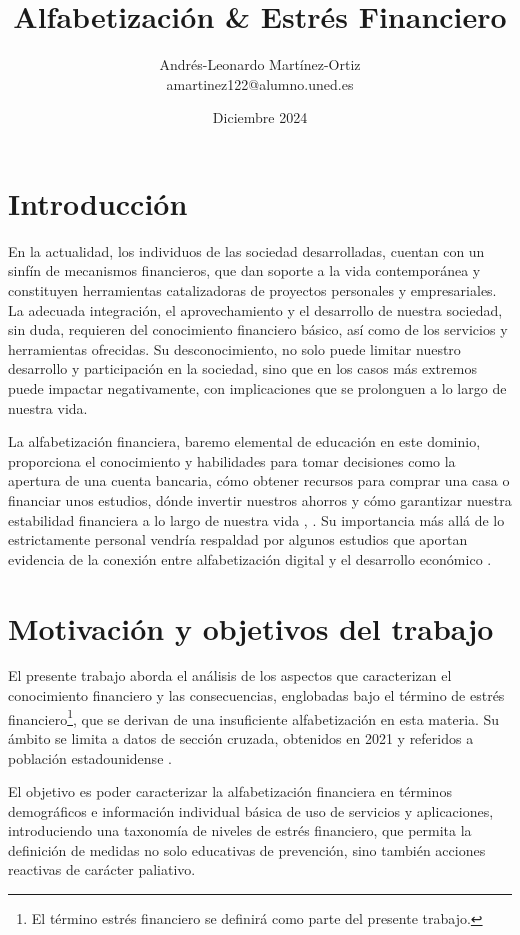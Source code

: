 \documentclass[a4paper, 11pt, bibliography=numbered, es]{article}
\title{Alfabetización \& Estrés Financiero}
\author{Andrés-Leonardo Martínez-Ortiz \\ amartinez122@alumno.uned.es}
\date{Diciembre 2024}
\begin{document}
\maketitle
\section{Introducción}
En la actualidad, los individuos de las sociedad desarrolladas, cuentan con 
un sinfín de mecanismos financieros, que dan soporte a la vida contemporánea
y constituyen herramientas catalizadoras de proyectos personales y empresariales. La adecuada integración, el aprovechamiento y el desarrollo de
nuestra sociedad, sin duda, requieren del conocimiento financiero básico, así como
de los servicios y herramientas ofrecidas. Su desconocimiento, no solo puede limitar
nuestro desarrollo y participación en la sociedad, sino que en los casos más extremos
puede impactar negativamente, con implicaciones que se prolonguen a lo largo de nuestra
vida. 

La alfabetización financiera, baremo elemental de educación en este dominio, 
proporciona el conocimiento y habilidades para tomar decisiones como la 
apertura de una cuenta bancaria, cómo obtener recursos para comprar una
casa o financiar unos estudios, dónde invertir nuestros ahorros y cómo 
garantizar nuestra estabilidad financiera a lo largo de nuestra vida
\cite{EU01}, \cite{OCDE01}. Su importancia más allá de lo estrictamente personal vendría respaldad por algunos estudios que aportan evidencia de
la conexión entre alfabetización digital y el desarrollo económico \cite{Lusardi14}. 

\section{Motivación y objetivos del trabajo}
\label{motivacion}
El presente trabajo aborda el análisis de los aspectos que caracterizan el conocimiento financiero y las consecuencias, englobadas bajo el término de estrés financiero\footnote{El término estrés financiero se definirá como parte del presente trabajo.}, que se derivan de una insuficiente alfabetización en esta materia. Su ámbito se limita a datos de
sección cruzada, obtenidos en 2021 y referidos a población estadounidense \cite{NFCS01}.

El objetivo es poder caracterizar la alfabetización financiera en términos demográficos e información individual básica de uso de servicios y aplicaciones, introduciendo una taxonomía de niveles de estrés financiero, que permita la definición de medidas no solo 
educativas de prevención, sino también acciones reactivas de carácter paliativo.
\end{document}
